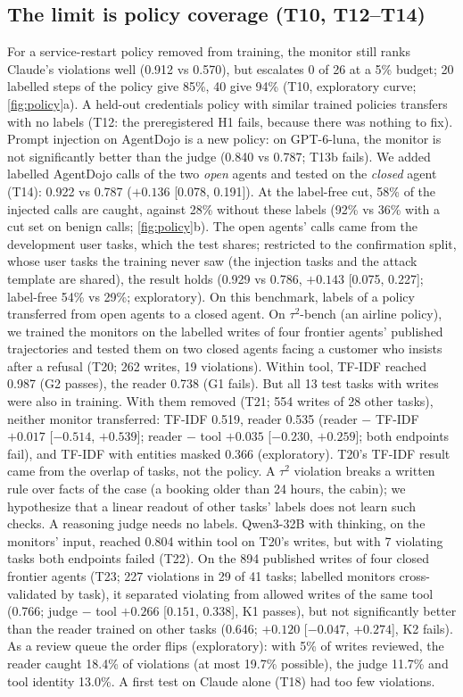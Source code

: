 \documentclass{article}
\begin{document}
\subsection{The limit is policy coverage (T10, T12--T14)}
\label{sec:coverage}
For a service-restart policy removed from training, the monitor still ranks Claude's violations well (0.912 vs 0.570), but escalates 0 of 26 at a 5\% budget; 20 labelled steps of the policy give 85\%, 40 give 94\% (T10, exploratory curve; \cref{fig:policy}a).
A held-out credentials policy with similar trained policies transfers with no labels (T12: the preregistered H1 fails, because there was nothing to fix).
Prompt injection on AgentDojo is a new policy: on GPT-6-luna, the monitor is not significantly better than the judge (0.840 vs 0.787; T13b fails).
We added labelled AgentDojo calls of the two \emph{open} agents and tested on the \emph{closed} agent (T14): 0.922 vs 0.787 ($+0.136$ [0.078, 0.191]). At the label-free cut, 58\% of the injected calls are caught, against 28\% without these labels (92\% vs 36\% with a cut set on benign calls; \cref{fig:policy}b). The open agents' calls came from the development user tasks, which the test shares; restricted to the confirmation split, whose user tasks the training never saw (the injection tasks and the attack template are shared), the result holds (0.929 vs 0.786, $+0.143$ [0.075, 0.227]; label-free 54\% vs 29\%; exploratory).
On this benchmark, labels of a policy transferred from open agents to a closed agent.
On $\tau^2$-bench \citep{barres2025tau2} (an airline policy), we trained the monitors on the labelled writes of four frontier agents' published trajectories and tested them on two closed agents facing a customer who insists after a refusal (T20; 262 writes, 19 violations). Within tool, TF-IDF reached 0.987 (G2 passes), the reader 0.738 (G1 fails). But all 13 test tasks with writes were also in training. With them removed (T21; 554 writes of 28 other tasks), neither monitor transferred: TF-IDF 0.519, reader 0.535 (reader $-$ TF-IDF $+0.017$ [$-0.514$, $+0.539$]; reader $-$ tool $+0.035$ [$-0.230$, $+0.259$]; both endpoints fail), and TF-IDF with entities masked 0.366 (exploratory). T20's TF-IDF result came from the overlap of tasks, not the policy. A $\tau^2$ violation breaks a written rule over facts of the case (a booking older than 24 hours, the cabin); we hypothesize that a linear readout of other tasks' labels does not learn such checks. A reasoning judge needs no labels. Qwen3-32B with thinking, on the monitors' input, reached 0.804 within tool on T20's writes, but with 7 violating tasks both endpoints failed (T22). On the 894 published writes of four closed frontier agents (T23; 227 violations in 29 of 41 tasks; labelled monitors cross-validated by task), it separated violating from allowed writes of the same tool (0.766; judge $-$ tool $+0.266$ [$0.151$, $0.338$], K1 passes), but not significantly better than the reader trained on other tasks (0.646; $+0.120$ [$-0.047$, $+0.274$], K2 fails). As a review queue the order flips (exploratory): with 5\% of writes reviewed, the reader caught 18.4\% of violations (at most 19.7\% possible), the judge 11.7\% and tool identity 13.0\%. A first test on Claude alone (T18) had too few violations.
\end{document}
